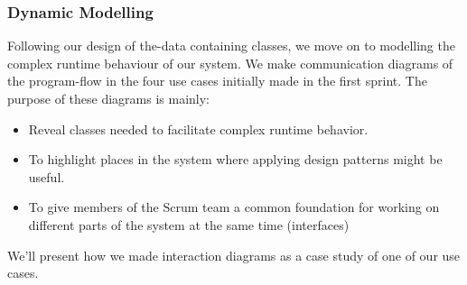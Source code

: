 \subsubsection{Dynamic Modelling}
Following our design of the-data containing classes, we move on to modelling the complex runtime behaviour of our system. We make communication diagrams of the program-flow in the four use cases initially made in the first sprint. The purpose of these diagrams is mainly:
\begin{itemize}
\item Reveal classes needed to facilitate complex runtime behavior. 
\item To highlight places in the system where applying design patterns might be useful.
\item To give members of the Scrum team a common foundation for working on different parts of the system at the same time (interfaces)
\end{itemize}
We’ll present how we made interaction diagrams as a case study of one of our use cases.
